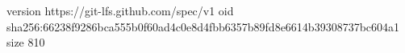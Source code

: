 version https://git-lfs.github.com/spec/v1
oid sha256:66238f9286bca555b0f60ad4c0e8d4fbb6357b89fd8e6614b39308737bc604a1
size 810
